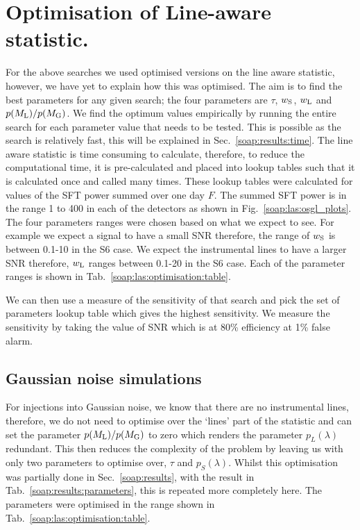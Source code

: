 \section{\label{soap:las:optimisation}Optimisation of Line-aware statistic.}

For the above searches we used optimised versions on the line aware statistic,
however, we have yet to explain how this was optimised.  The aim is to find the
best parameters for any given search; the four parameters are
$\tau$, $w_{\rm{S}}$, $w_{\rm{L}}$ and $p(M_{\rm{L}})/p(M_{\rm{G}})$.  We find
the optimum values empirically by running the entire search for each parameter
value that needs to be tested. This is possible as the search is relatively
fast, this will be explained in Sec.~\ref{soap:results:time}.  The line aware
statistic is time consuming to calculate, therefore, to reduce the
computational time, it is pre-calculated and placed into lookup tables such
that it is calculated once and called many times.  These lookup tables were
calculated for values of the \gls{SFT} power summed over one day $F$. The summed \gls{SFT} power is in the range 1 to 400 in each of the detectors as shown in Fig.~\ref{soap:las:osgl_plots}.
The four parameters ranges were chosen based on what we expect to see.
For example we expect a signal to have a small \gls{SNR} therefore, the range of $w_{\rm{S}}$ is between 0.1-10 in the S6 case.
We expect the instrumental lines to have a larger \gls{SNR} therefore, $w_{\rm{L}}$ ranges between 0.1-20 in the S6 case. Each of the parameter ranges is shown in Tab.~\ref{soap:las:optimisation:table}.

We can then use a measure of the sensitivity of that search and pick the set of parameters lookup
table which gives the highest sensitivity. 
We measure the sensitivity by taking the value of \gls{SNR} which is at 80\% efficiency at 1\% false alarm. 

\subsection{Gaussian noise simulations}

For injections into Gaussian noise, we know that there are no instrumental
lines, therefore, we do not need to optimise over the `lines' part of the
statistic and can set the parameter $p(M_{\rm{L}})/p(M_{\rm{G}})$ to zero which renders the
parameter $p_L(\lambda)$ redundant. 
This then reduces the complexity of the problem by leaving us with only two parameters to optimise over, $\tau$ and $p_S(\lambda)$. 
Whilst this optimisation was partially done in Sec.~\ref{soap:results}, with the result in Tab.~\ref{soap:results:parameters}, this is repeated more completely here.
The parameters were optimised in the range shown in Tab.~\ref{soap:las:optimisation:table}. 

